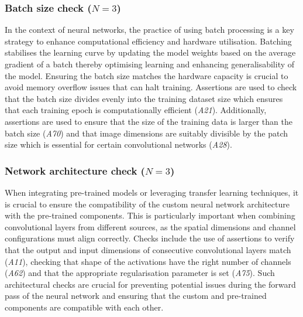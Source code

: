 
\subsubsection{Batch size check ($N = 3$)}

In the context of neural networks, the practice of using batch processing is a key strategy to enhance computational efficiency and hardware utilisation. Batching stabilises the learning curve by updating the model weights based on the average gradient of a batch thereby optimising learning and enhancing generalisability of the model. Ensuring the batch size matches the hardware capacity is crucial to avoid memory overflow issues that can halt training. Assertions are used to check that the batch size divides evenly into the training dataset size which ensures that each training epoch is computationally efficient (\emph{A21}). Additionally, assertions are used to ensure that the size of the training data is larger than the batch size (\emph{A70}) and that image dimensions are suitably divisible by the patch size which is essential for certain convolutional networks (\emph{A28}).


\subsubsection{Network architecture check ($N = 3$)}

When integrating pre-trained models or leveraging transfer learning techniques, it is crucial to ensure the compatibility of the custom neural network architecture with the pre-trained components. This is particularly important when combining convolutional layers from different sources, as the spatial dimensions and channel configurations must align correctly. Checks include the use of assertions to verify that the output and input dimensions of consecutive convolutional layers match (\emph{A11}), checking that shape of the activations have the right number of channels (\emph{A62}) and that the appropriate regularisation parameter is set (\emph{A75}). Such architectural checks are crucial for preventing potential issues during the forward pass of the neural network and ensuring that the custom and pre-trained components are compatible with each other.

